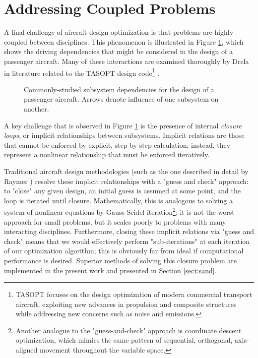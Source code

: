 \section{Addressing Coupled Problems}
\label{sect:coupling}

A final challenge of aircraft design optimization is that problems are highly coupled between disciplines. This phenomenon is illustrated in Figure \ref{fig:coupled-subsystems}, which shows the driving dependencies that might be considered in the design of a passenger aircraft. Many of these interactions are examined thoroughly by Drela in literature related to the TASOPT design code\footnote{TASOPT focuses on the design optimization of modern commercial transport aircraft, exploiting new advances in propulsion and composite structures while addressing new concerns such as noise and emissions.} \cite{Drela2011, tasopt}.

\begin{figure}[H]
    \centering
    \ifdraft{}{\centerline{}}
    \caption{Commonly-studied subsystem dependencies for the design of a passenger aircraft. Arrows denote influence of one subsystem on another.}
    \label{fig:coupled-subsystems}
\end{figure}

A key challenge that is observed in Figure \ref{fig:coupled-subsystems} is the presence of internal \textit{closure loops}, or implicit relationships between subsystems. Implicit relations are those that cannot be enforced by explicit, step-by-step calculation; instead, they represent a nonlinear relationship that must be enforced iteratively.

Traditional aircraft design methodologies (such as the one described in detail by Raymer \cite{raymer}) resolve these implicit relationships with a "guess and check" approach: to "close" any given design, an initial guess is assumed at some point, and the loop is iterated until closure. Mathematically, this is analogous to solving a system of nonlinear equations by Gauss-Seidel iteration\footnote{Another analogue to the "guess-and-check" approach is coordinate descent optimization, which mimics the same pattern of sequential, orthogonal, axis-aligned movement throughout the variable space.}; it is not the worst approach for small problems, but it scales poorly to problems with many interacting disciplines. Furthermore, closing these implicit relations via "guess and check" means that we would effectively perform "sub-iterations" at each iteration of our optimization algorithm; this is obviously far from ideal if computational performance is desired. Superior methods of solving this closure problem are implemented in the present work and presented in Section \ref{sect:sand}.


